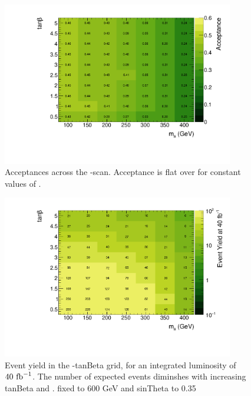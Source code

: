 \begin{figure}
\centering
\includegraphics[width=0.9\textwidth]{texinputs/04_grid/figures/monoz/leptonic/tanbma_ae_ll.pdf}
\caption{Acceptances across the \ma-\tanb scan.  Acceptance is flat over \tanb for constant values of \ma.}
\label{fig:monoz_ll_tanbma_acceptance}
\end{figure}

\begin{figure}
\centering
\includegraphics[width=0.9\textwidth]{texinputs/04_grid/figures/monoz/leptonic/tanbma_yield_ll.pdf}
\caption{Event yield in the \ma-tanBeta grid, for an integrated luminosity of $40~\rm{fb}^{-1}$.  The number of expected events diminshes with increasing tanBeta and \ma.  \mA fixed to 600 GeV and sinTheta to 0.35}
\end{figure}


